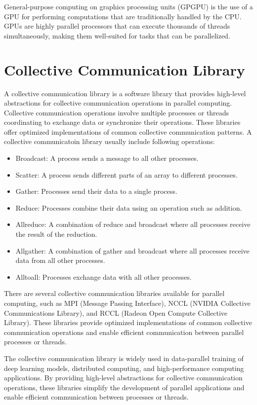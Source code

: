 General-purpose computing on graphics processing units (GPGPU) is the
use of a GPU for performing computations that are traditionally
handled by the CPU. GPUs are highly parallel processors that can
execute thousands of threads simultaneously, making them well-suited
for tasks that can be parallelized.


\section {Collective Communication Library}

A collective communication library is a software library that provides
high-level abstractions for collective communication operations in
parallel computing. Collective communication operations involve
multiple processes or threads coordinating to exchange data or
synchronize their operations. These libraries offer optimized
implementations of common collective communication patterns.
A collective communicatoin library usually include following operations:

\begin{itemize}
    \item Broadcast: A process sends a message to all other processes.
    \item Scatter: A process sends different parts of an array to
    different processes.
    \item Gather: Processes send their data to a single process.
    \item Reduce: Processes combine their data using an operation such as
    addition.
    \item Allreduce: A combination of reduce and broadcast where all
    processes receive the result of the reduction.
    \item Allgather: A combination of gather and broadcast where all
    processes receive data from all other processes.
    \item Alltoall: Processes exchange data with all other processes.
\end{itemize}


There are several collective communication libraries available for
parallel computing, such as MPI (Message Passing Interface), NCCL
(NVIDIA Collective Communications Library), and RCCL (Radeon Open
Compute Collective Library). These libraries provide optimized
implementations of common collective communication operations and
enable efficient communication between parallel processes or threads.

The collective communication library is widely used in data-parallel
training of deep learning models, distributed computing, and
high-performance computing applications. By providing high-level
abstractions for collective communication operations, these libraries
simplify the development of parallel applications and enable efficient
communication between processes or threads.



